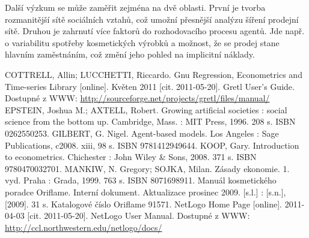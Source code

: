 \documentclass[a4wide,12pt]{report}
\begin{document}
Další výzkum se může zaměřit zejména na dvě oblasti. První je tvorba rozmanitější sítě sociálních vztahů, což umožní přesnější analýzu šíření prodejní sítě. Druhou je zahrnutí více faktorů do rozhodovacího procesu agentů. Jde např. o variabilitu spotřeby kosmetických výrobků a možnost, že se prodej stane hlavním zaměstnáním, což změní jeho pohled na implicitní náklady.
\begin{thebibliography}{9}

COTTRELL, Allin; LUCCHETTI, Riccardo. Gnu Regression, Econometrics and Time-series Library [online]. Květen 2011 [cit. 2011-05-20].  Gretl User’s Guide. Dos\-tup\-né z WWW: \url{http://sourceforge.net/projects/gretl/files/manual/}
EPSTEIN, Joshua M.; AXTELL, Robert. Growing artificial societies : social science from the bottom up. Cambridge, Mass. : MIT Press,  1996. 208 s. ISBN 0262550253.
GILBERT, G. Nigel. Agent-based models. Los Angeles : Sage Publications,  c2008. xiii, 98 s. ISBN 9781412949644.
KOOP, Gary. Introduction to econometrics. Chichester : John Wiley \& Sons,  2008. 371 s. ISBN 9780470032701.
MANKIW, N. Gregory; SOJKA, Milan. Zásady ekonomie. 1. vyd. Praha : Grada,  1999. 763 s. ISBN 8071698911.
 Manuál kosmetického poradce Oriflame. Interní dokument. Aktualizace prosinec 2009. [s.l.] : [s.n.],  [2009]. 31 s. Katalogové číslo Oriflame 91571.
 NetLogo Home Page [online]. 2011-04-03 [cit. 2011-05-20].  NetLogo User Manual. Dostupné z WWW: \url{http://ccl.northwestern.edu/netlogo/docs/}
\end{thebibliography}

\end{document}
